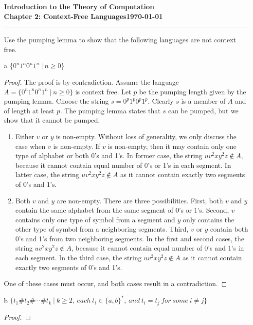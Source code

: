 \documentclass[11pt]{article}
\newcommand{\dated}{\today}
\begin{document}
\textbf{Introduction to the Theory of
Computation}\hfill\textbf{\myname}\\[0.01in]
\textbf{Chapter 2: Context-Free Languages}\hfill\textbf{\dated}\\
\smallskip\hrule\bigskip

\begin{problem}{2.30}
Use the pumping lemma to show that the following languages are not context free.
\end{problem}

\begin{problem}[Part]{a}
$\{0^{n}1^{n}0^{n}1^{n} \ | \ n \geq 0\}$
\end{problem}

\begin{proof}
The proof is by contradiction. Assume the language $A = \{0^{n}1^{n}0^{n}1^{n} \ | \ n \geq 0\}$ is context free. Let $p$ be the pumping length given by the pumping lemma. Choose the string $s = 0^{p}1^{p}0^{p}1^{p}$. Clearly $s$ is a member of $A$ and of length at least $p$. The pumping lemma states that $s$ can be pumped, but we show that it cannot be pumped.

\begin{enumerate}
\item Either $v$ or $y$ is non-empty. Without loss of generality, we only discuss the case when $v$ is non-empty. If $v$ is non-empty, then it may contain only one type of alphabet or both 0's and 1's. In former case, the string $uv^{2}xy^{2}z \notin A$, because it cannot contain equal number of 0's or 1's in each segment. In latter case, the string $uv^{2}xy^{2}z \notin A$ as it cannot contain exactly two segments of 0's and 1's.
\item Both $v$ and $y$ are non-empty. There are three possibilities. First, both $v$ and $y$ contain the same alphabet from the same segment of 0's or 1's. Second, $v$ contains only one type of symbol from a segment and $y$ only contains the other type of symbol from a neighboring segments. Third, $v$ or $y$ contain both 0's and 1's from two neighboring segments. In the first and second cases, the string $uv^{2}xy^{2}z \notin A$, because it cannot contain equal number of 0's and 1's in each segment. In the third case, the string $uv^{2}xy^{2}z \notin A$ as it cannot contain exactly two segments of 0's and 1's.
\end{enumerate}
One of these cases must occur, and both cases result in a contradiction.
\end{proof}

\begin{problem}[Part]{b}
$\{ t_{1} \# t_{2} \# \cdots \# t_{k} \ | \ k \geq 2, \ each \ t_{i} \in \{a, b\}^{*}, \ and \ t_{i} = t_{j} \ for \ some \ i \neq  j \}$
\end{problem}

\begin{proof}
\end{proof}
\end{document}
